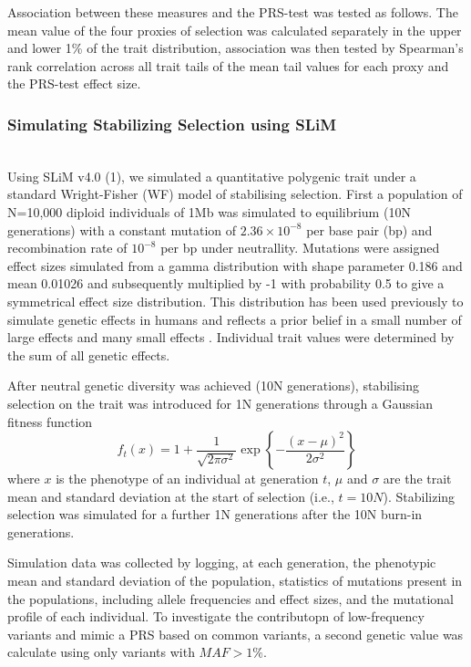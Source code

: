 \documentclass[times]{zHenriquesLab-StyleBioRxiv}
\begin{document}
Association between these measures and the PRS-test was tested as
follows.  The mean value of the four proxies of selection was
calculated separately in the upper and lower 1\% of the trait
distribution, association was then tested by Spearman's rank
correlation across all trait tails of the mean tail values for each
proxy and the PRS-test effect size.

\subsubsection*{Simulating Stabilizing Selection using SLiM} ~\\
Using SLiM v4.0 (1), we simulated a quantitative polygenic trait under
a standard Wright-Fisher (WF) model of stabilising selection. First a
population of N=10,000 diploid individuals of 1Mb was simulated to
equilibrium (10N generations) with a constant mutation of
$2.36\times 10^{-8}$ per base pair (bp) and recombination rate of
$10^{-8}$ per bp under neutrallity. Mutations were assigned effect
sizes simulated from a gamma distribution with shape parameter 0.186
and mean 0.01026 and subsequently multiplied by -1 with probability
0.5 to give a symmetrical effect size distribution. This distribution
has been used previously to simulate genetic effects in humans and
reflects a prior belief in a small number of large effects and many
small effects \cite{anil3}. Individual trait values were determined by
the sum of all genetic effects.

After neutral genetic diversity was achieved (10N generations),
stabilising selection on the trait was introduced for 1N
generations through a Gaussian fitness function
\begin{equation} 
  f_t(x) = 1 + \frac{1}{\sqrt{2\pi\sigma^2}} \exp\left\{-\frac{(x-\mu)^2}{2\sigma^2}\right\}
\end{equation}
where $x$ is the phenotype of an individual at generation $t$, $\mu$
and $\sigma$ are the trait mean and standard deviation at the start of
selection (i.e., $t=10N$). Stabilizing selection was simulated for a
further 1N generations after the 10N burn-in generations.

Simulation data was collected by logging, at each generation, the
phenotypic mean and standard deviation of the population, statistics
of mutations present in the populations, including allele frequencies
and effect sizes, and the mutational profile of each individual. To
investigate the contributopn of low-frequency variants and mimic a PRS
based on common variants, a second genetic value was calculate using
only variants with $MAF > 1\%$.
\end{document}

